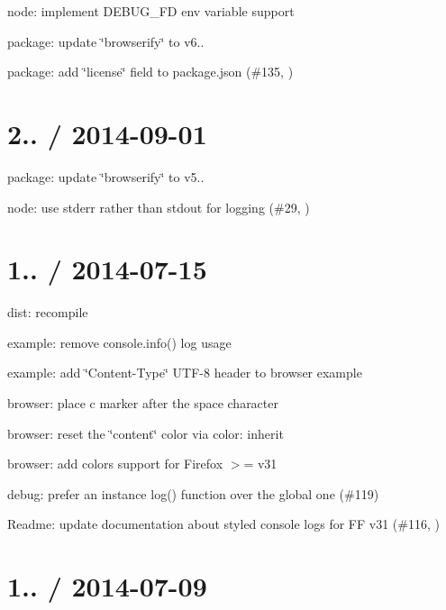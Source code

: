 \begin{DoxyItemize}
\item node\+: implement {\ttfamily D\+E\+B\+U\+G\+\_\+\+F\+D} env variable support
\item package\+: update \char`\"{}browserify\char`\"{} to v6..
\item package\+: add \char`\"{}license\char`\"{} field to package.\+json (\#135, )
\end{DoxyItemize}

\section*{2.. / 2014-\/09-\/01 }


\begin{DoxyItemize}
\item package\+: update \char`\"{}browserify\char`\"{} to v5..
\item node\+: use stderr rather than stdout for logging (\#29, )
\end{DoxyItemize}

\section*{1.. / 2014-\/07-\/15 }


\begin{DoxyItemize}
\item dist\+: recompile
\item example\+: remove {\ttfamily console.\+info()} log usage
\item example\+: add \char`\"{}\+Content-\/\+Type\char`\"{} U\+T\+F-\/8 header to browser example
\item browser\+: place c marker after the space character
\item browser\+: reset the \char`\"{}content\char`\"{} color via {\ttfamily color\+: inherit}
\item browser\+: add colors support for Firefox $>$= v31
\item debug\+: prefer an instance {\ttfamily log()} function over the global one (\#119)
\item Readme\+: update documentation about styled console logs for F\+F v31 (\#116, )
\end{DoxyItemize}

\section*{1.. / 2014-\/07-\/09 }


